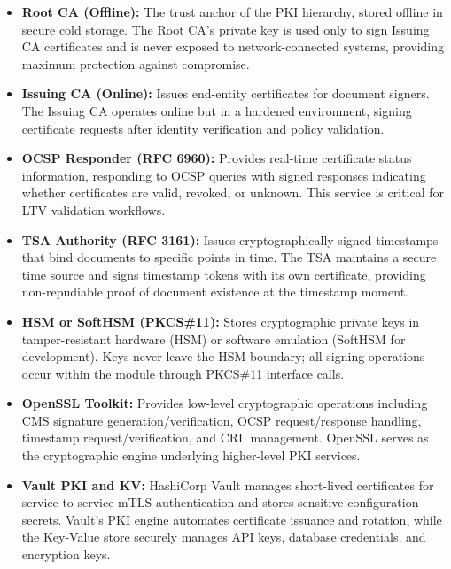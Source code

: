 \documentclass[12pt,oneside,openright,a4paper]{cpe-english-project}
\begin{document}
\begin{itemize}
\item \textbf{Root CA (Offline):} The trust anchor of the PKI hierarchy, stored offline in secure cold storage. The Root CA's private key is used only to sign Issuing CA certificates and is never exposed to network-connected systems, providing maximum protection against compromise.

\item \textbf{Issuing CA (Online):} Issues end-entity certificates for document signers. The Issuing CA operates online but in a hardened environment, signing certificate requests after identity verification and policy validation.

\item \textbf{OCSP Responder (RFC 6960):} Provides real-time certificate status information, responding to OCSP queries with signed responses indicating whether certificates are valid, revoked, or unknown. This service is critical for LTV validation workflows.

\item \textbf{TSA Authority (RFC 3161):} Issues cryptographically signed timestamps that bind documents to specific points in time. The TSA maintains a secure time source and signs timestamp tokens with its own certificate, providing non-repudiable proof of document existence at the timestamp moment.

\item \textbf{HSM or SoftHSM (PKCS\#11):} Stores cryptographic private keys in tamper-resistant hardware (HSM) or software emulation (SoftHSM for development). Keys never leave the HSM boundary; all signing operations occur within the module through PKCS\#11 interface calls.

\item \textbf{OpenSSL Toolkit:} Provides low-level cryptographic operations including CMS signature generation/verification, OCSP request/response handling, timestamp request/verification, and CRL management. OpenSSL serves as the cryptographic engine underlying higher-level PKI services.

\item \textbf{Vault PKI and KV:} HashiCorp Vault manages short-lived certificates for service-to-service mTLS authentication and stores sensitive configuration secrets. Vault's PKI engine automates certificate issuance and rotation, while the Key-Value store securely manages API keys, database credentials, and encryption keys.
\end{itemize}
\end{document}
